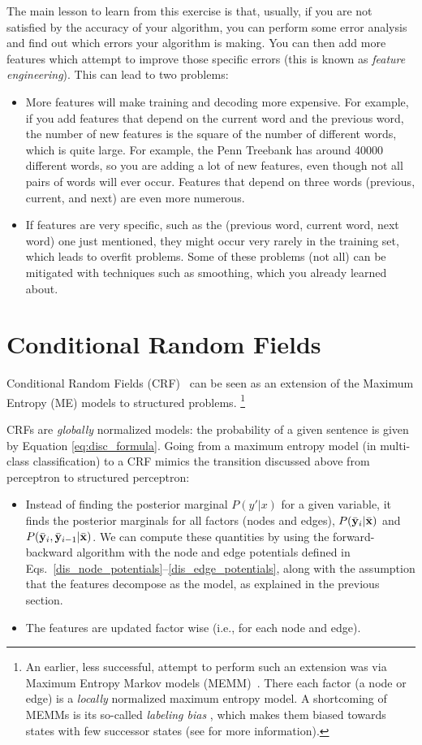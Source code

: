 The main lesson to learn from this exercise is that, usually, if you are not satisfied by the accuracy of your algorithm, you can perform some error analysis and find out which errors your algorithm is making. You can then add more features which attempt to improve those specific errors (this is known as \emph{feature engineering}). This can lead to two problems:
\begin{itemize}
\item More features will make training and decoding more expensive. For example, if you add features that depend on the current word and the previous word, the number of new features is the square of the number of different words, which is quite large. For example, the Penn Treebank has around 40000 different words, so you are adding a lot of new features, even though not all pairs of words will ever occur. Features that depend on three words (previous, current, and next) are even more numerous.
\item If features are very specific, such as the (previous word, current word, next word) one just mentioned, they might occur very rarely in the training set, which leads to overfit problems. Some of these problems (not all) can be mitigated with techniques such as smoothing, which you already learned about.
\end{itemize}


\section{\label{s:crf}Conditional Random Fields}

Conditional Random Fields (CRF)~\citep{lafferty2001conditional} can be seen
as an extension of the Maximum Entropy (ME) models to structured problems.%
\footnote{An earlier, less successful, attempt to perform such an extension was via Maximum Entropy Markov
models (MEMM)~\citep{mccallum2000maximum}. There each factor (a node or edge) 
is a \emph{locally} normalized maximum entropy model. A shortcoming of MEMMs is its 
so-called \emph{labeling bias} \citep{Bottou1991}, which makes them biased towards states
with few successor states (see \cite{lafferty2001conditional} for more information).}

CRFs are \emph{globally} normalized models: the probability of a given
sentence is given by Equation \ref{eq:disc_formula}. 
Going from a maximum entropy model (in multi-class classification) 
to a CRF mimics the transition discussed above from 
perceptron to structured perceptron: 
\begin{itemize}
\item Instead of finding the posterior marginal $P(y'|x)$ for a given
  variable, it finds the posterior marginals for all factors (nodes and edges), 
  $P(\bar{\mathbf{y}}_i | \bar{\mathbf{x}})$ and  $P(\bar{\mathbf{y}}_i, \bar{\mathbf{y}}_{i-1}| \bar{\mathbf{x}})$. 
  We can compute these quantities by using the forward-backward algorithm with the node and edge potentials 
  defined in Eqs.~\ref{dis_node_potentials}--\ref{dis_edge_potentials}, 
  along with the assumption that the features
  decompose as the model, as explained in the previous section.
\item The features are updated factor wise (i.e., for each node and edge). 
\end{itemize}

